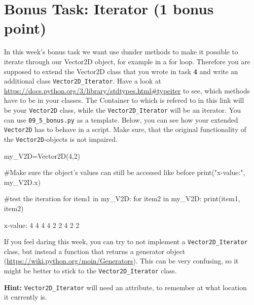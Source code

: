 
\section{Bonus Task: Iterator (1 bonus point)}

In this week's bonus task we want use dunder methods to make it possible to iterate through our Vector2D object, for example in a for loop. Therefore you are supposed to  extend the Vector2D class that you wrote in task \textbf{4} and write an additional class \texttt{Vector2D\_Iterator}. Have a look at\\ \href{https://docs.python.org/3/library/stdtypes.html\#typeiter}{https://docs.python.org/3/library/stdtypes.html\#typeiter} to see, which methods have to be in your classes. The Container to which is refered to in this link will be your \texttt{Vector2D} class, while the \texttt{Vector2D\_Iterator} will be an iterator. You can use \texttt{09\_5\_bonus.py} as a template. Below, you can see how your extended \texttt{Vector2D} has to behave in a script. Make sure, that the original functionality of the \texttt{Vector2D}-objects is not impaired.

\begin{pythoncode}

my_V2D=Vector2D(4,2)

#Make sure the object's values can still be accessed like before
print("x-value:", my_V2D.x)

#test the iteration
for item1 in my_V2D:
    for item2 in my_V2D:
        print(item1, item2)
\end{pythoncode}

\begin{outputcode}
x-value: 4
4 4
4 2
2 4
2 2
\end{outputcode}

\noindent If you feel daring this week, you can try to not implement a \texttt{Vector2D\_Iterator} class, but instead a function that returns a generator object (\href{https://wiki.python.org/moin/Generators}{https://wiki.python.org/moin/Generators}). This can be very confusing, so it might be better to stick to the \texttt{Vector2D\_Iterator} class.
\vspace{1em}

\noindent \textbf{Hint:} \texttt{Vector2D\_Iterator} will need an attribute, to remember at what location it currently is.

